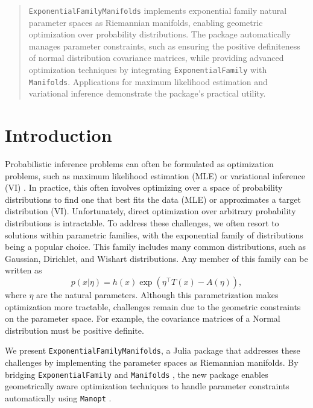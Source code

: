 \documentclass{juliacon}
\begin{document}


\maketitle
\begin{abstract}
\texttt{ExponentialFamilyManifolds} implements exponential family natural parameter spaces as Riemannian manifolds, enabling geometric optimization over probability distributions. The package automatically manages parameter constraints, such as ensuring the positive definiteness of normal distribution covariance matrices, while providing advanced optimization techniques by integrating \texttt{ExponentialFamily} with \texttt{Manifolds}. Applications for maximum likelihood estimation and variational inference demonstrate the package's practical utility.
\end{abstract}

\section{Introduction}

Probabilistic inference problems can often be formulated as optimization problems, such as maximum likelihood estimation (MLE) or variational inference (VI) \cite{blei_variational_2017}. In practice, this often involves optimizing over a space of probability distributions to find one that best fits the data (MLE) or approximates a target distribution (VI). Unfortunately, direct optimization over arbitrary probability distributions is intractable. To address these challenges, we often resort to solutions within parametric families, with the exponential family of distributions being a popular choice. This family includes many common distributions, such as Gaussian, Dirichlet, and Wishart distributions. Any member of this family can be written as
\begin{equation*}\label{eq:exponential-family}
p(x|\eta) = h(x)\exp\left(\eta^\top T(x) - A(\eta)\right),
\end{equation*}
where $\eta$ are the natural parameters. Although this parametrization makes optimization more tractable, challenges remain due to the geometric constraints on the parameter space. For example, the covariance matrices of a Normal distribution must be positive definite.

We present \texttt{ExponentialFamilyManifolds}, a Julia \cite{bezanson2017julia} package that addresses these challenges by implementing the parameter spaces as Riemannian manifolds. By bridging \texttt{ExponentialFamily} \cite{Senoz_ExponentialFamily_jl_2023} and \texttt{Manifolds} \cite{axen_manifoldsjl_2023}, the new package enables geometrically aware optimization techniques to handle parameter constraints automatically using \texttt{Manopt} \cite{bergmann_manoptjl_2022}.
\end{document}
